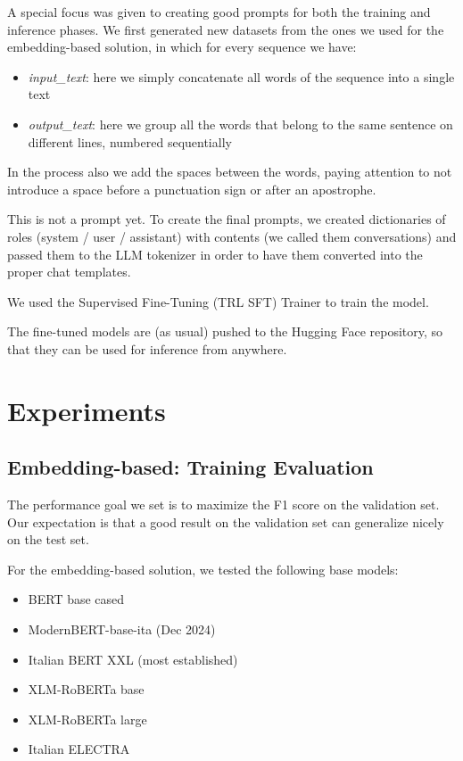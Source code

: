 \documentclass[11pt]{article}
\begin{document}
A special focus was given to creating good prompts for both the training and inference phases.
We first generated new datasets from the ones we used for the embedding-based solution, in which 
for every sequence we have:

 \begin{itemize}
 	\item \emph{input\_text}: here we simply concatenate all words of the sequence into a single text
 	\item \emph{output\_text}: here we group all the words that belong to the same sentence on different lines, numbered sequentially
 \end{itemize}
 
 In the process also we add the spaces between the words, paying attention to
 not introduce a space before a punctuation sign or after an apostrophe.
 
 This is not a prompt yet. To create the final prompts, we created dictionaries of roles (system / user / assistant) with contents (we called them conversations) and passed them to the LLM tokenizer in order to have them converted into the proper chat templates. 
 
 We used the Supervised Fine-Tuning (TRL SFT) Trainer to train the model.

The fine-tuned models are (as usual) pushed to the Hugging Face repository, so that they can be used for inference from anywhere.

\section{Experiments}

\subsection{Embedding-based: Training Evaluation}

The performance goal we set is to maximize the F1 score on the validation set. Our expectation is that a good result on the
validation set can generalize nicely on the test set.

For the embedding-based solution, we tested the following base models:

 \begin{itemize}
 	\item BERT base cased
	\item ModernBERT-base-ita (Dec 2024)
	\item Italian BERT XXL (most established)
	\item XLM-RoBERTa base
	\item XLM-RoBERTa large
	\item Italian ELECTRA
\end{itemize}
\end{document}
